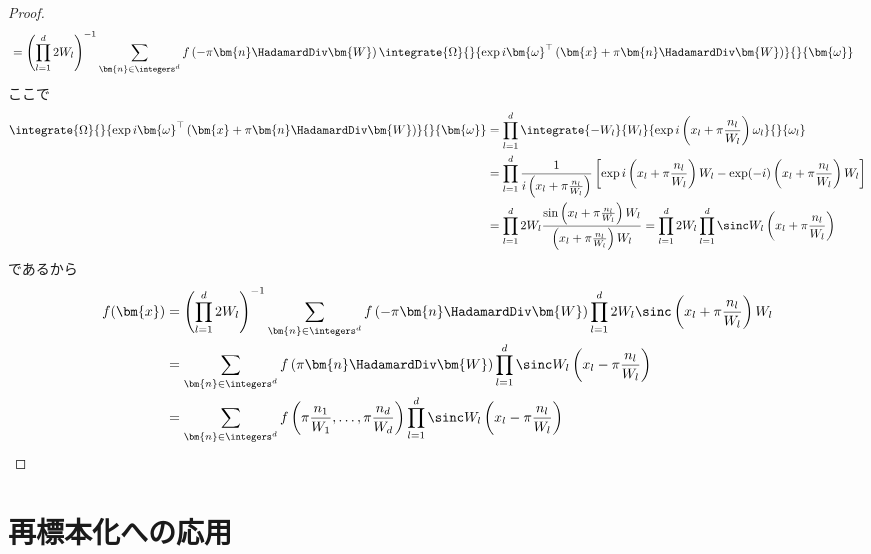 \begin{proof}
\begin{align*}
                &= \left(\prod_{l=1}^d 2W_l\right)^{-1} \sum_{\bm{n}\in\integers^d} f\left(-\pi\bm{n}\HadamardDiv\bm{W}\right) \integrate{\Omega}{}{\exp i \bm{\omega}^\top\left(\bm{x} + \pi\bm{n}\HadamardDiv\bm{W}\right) }{}{\bm{\omega}}
            \end{align*}
            ここで
            \begin{align*}
                \integrate{\Omega}{}{\exp i \bm{\omega}^\top\left(\bm{x} + \pi\bm{n}\HadamardDiv\bm{W}\right) }{}{\bm{\omega}} &= \prod_{l=1}^d \integrate{-W_l}{W_l}{\exp i\left(x_l + \pi\frac{n_l}{W_l}\right)\omega_l}{}{\omega_l} \\
                &= \prod_{l=1}^d \frac{1}{i\left(x_l + \pi\frac{n_l}{W_l}\right)}\left[\exp i\left(x_l + \pi\frac{n_l}{W_l}\right)W_l - \exp (-i)\left(x_l + \pi\frac{n_l}{W_l}\right)W_l\right] \\
                &= \prod_{l=1}^d 2W_l \frac{\sin \left(x_l + \pi\frac{n_l}{W_l}\right)W_l}{\left(x_l + \pi\frac{n_l}{W_l}\right)W_l} = \prod_{l=1}^d 2W_l \prod_{l=1}^d \sinc W_l\left(x_l + \pi\frac{n_l}{W_l}\right)
            \end{align*}
            であるから
            \begin{align*}
                f(\bm{x}) &= \left(\prod_{l=1}^d 2W_l\right)^{-1}\sum_{\bm{n}\in\integers^d} f\left(-\pi\bm{n}\HadamardDiv\bm{W}\right) \prod_{l=1}^d 2W_l \sinc \left(x_l + \pi\frac{n_l}{W_l}\right)W_l \\
                &= \sum_{\bm{n}\in\integers^d} f\left(\pi\bm{n}\HadamardDiv\bm{W}\right) \prod_{l=1}^d \sinc W_l\left(x_l - \pi\frac{n_l}{W_l}\right) \\
                &= \sum_{\bm{n}\in\integers^d} f\left(\pi\frac{n_1}{W_1},\dots,\pi\frac{n_d}{W_d}\right) \prod_{l=1}^d \sinc W_l\left(x_l - \pi\frac{n_l}{W_l}\right)
            \end{align*}
        \end{proof}
    \section{再標本化への応用}
        \newcommand*{\fsampWithSubsc}[1]{f_{\text{s},#1}}
